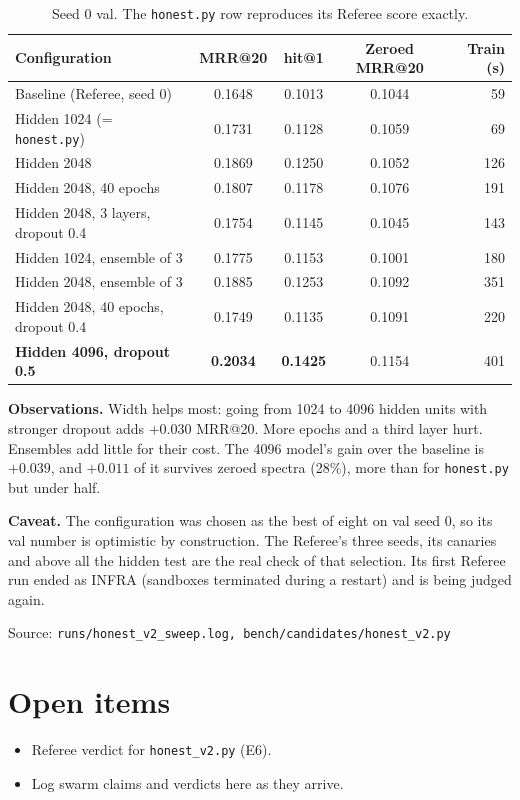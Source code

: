 \documentclass[11pt]{article}
\newcommand{\src}[1]{{\small\color{black!60}Source: \texttt{#1}}}
\begin{document}
\begin{table}[h]
\centering\small
\begin{tabular}{lcccr}
\toprule
Configuration & MRR@20 & hit@1 & Zeroed MRR@20 & Train (s) \\
\midrule
Baseline (Referee, seed 0) & 0.1648 & 0.1013 & 0.1044 & 59 \\
Hidden 1024 (= \texttt{honest.py}) & 0.1731 & 0.1128 & 0.1059 & 69 \\
Hidden 2048 & 0.1869 & 0.1250 & 0.1052 & 126 \\
Hidden 2048, 40 epochs & 0.1807 & 0.1178 & 0.1076 & 191 \\
Hidden 2048, 3 layers, dropout 0.4 & 0.1754 & 0.1145 & 0.1045 & 143 \\
Hidden 1024, ensemble of 3 & 0.1775 & 0.1153 & 0.1001 & 180 \\
Hidden 2048, ensemble of 3 & 0.1885 & 0.1253 & 0.1092 & 351 \\
Hidden 2048, 40 epochs, dropout 0.4 & 0.1749 & 0.1135 & 0.1091 & 220 \\
\textbf{Hidden 4096, dropout 0.5} & \textbf{0.2034} & \textbf{0.1425} & 0.1154 & 401 \\
\bottomrule
\end{tabular}
\caption{Seed 0 val. The \texttt{honest.py} row reproduces its Referee score exactly.}
\end{table}

\textbf{Observations.} Width helps most: going from 1024 to 4096 hidden units with stronger dropout adds $+0.030$
MRR@20. More epochs and a third layer hurt. Ensembles add little for their cost. The 4096 model's gain over the
baseline is $+0.039$, and $+0.011$ of it survives zeroed spectra (28\%), more than for \texttt{honest.py} but under half.

\textbf{Caveat.} The configuration was chosen as the best of eight on val seed 0, so its val number is optimistic by
construction. The Referee's three seeds, its canaries and above all the hidden test are the real check of that
selection. Its first Referee run ended as INFRA (sandboxes terminated during a restart) and is being judged again.

\src{runs/honest\_v2\_sweep.log, bench/candidates/honest\_v2.py}

\section*{Open items}
\begin{itemize}
  \item Referee verdict for \texttt{honest\_v2.py} (E6).
  \item Log swarm claims and verdicts here as they arrive.
\end{itemize}
\end{document}
